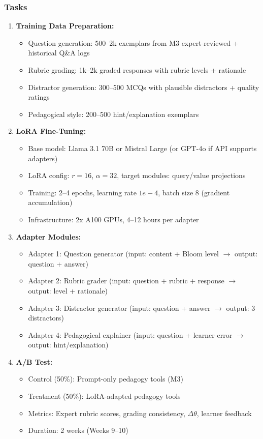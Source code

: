 \documentclass[11pt,letterpaper]{article}
\begin{document}
\subsubsection{Tasks}
\begin{enumerate}
\item \textbf{Training Data Preparation:}
\begin{itemize}
\item Question generation: 500--2k exemplars from M3 expert-reviewed + historical Q\&A logs
\item Rubric grading: 1k--2k graded responses with rubric levels + rationale
\item Distractor generation: 300--500 MCQs with plausible distractors + quality ratings
\item Pedagogical style: 200--500 hint/explanation exemplars
\end{itemize}

\item \textbf{LoRA Fine-Tuning:}
\begin{itemize}
\item Base model: Llama 3.1 70B or Mistral Large (or GPT-4o if API supports adapters)
\item LoRA config: $r=16$, $\alpha=32$, target modules: query/value projections
\item Training: 2--4 epochs, learning rate $1e-4$, batch size 8 (gradient accumulation)
\item Infrastructure: 2x A100 GPUs, 4--12 hours per adapter
\end{itemize}

\item \textbf{Adapter Modules:}
\begin{itemize}
\item Adapter 1: Question generator (input: content + Bloom level $\rightarrow$ output: question + answer)
\item Adapter 2: Rubric grader (input: question + rubric + response $\rightarrow$ output: level + rationale)
\item Adapter 3: Distractor generator (input: question + answer $\rightarrow$ output: 3 distractors)
\item Adapter 4: Pedagogical explainer (input: question + learner error $\rightarrow$ output: hint/explanation)
\end{itemize}

\item \textbf{A/B Test:}
\begin{itemize}
\item Control (50\%): Prompt-only pedagogy tools (M3)
\item Treatment (50\%): LoRA-adapted pedagogy tools
\item Metrics: Expert rubric scores, grading consistency, $\Delta\theta$, learner feedback
\item Duration: 2 weeks (Weeks 9--10)
\end{itemize}


\end{enumerate}
\end{document}
